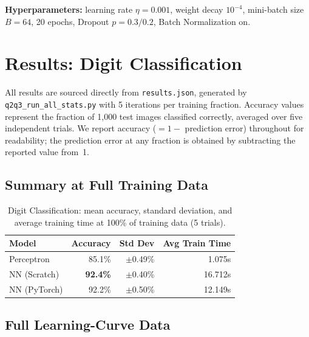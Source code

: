 \documentclass[12pt]{article}
\begin{document}
\textbf{Hyperparameters:} learning rate $\eta = 0.001$, weight decay $10^{-4}$,
mini-batch size $B = 64$, 20 epochs, Dropout $p = 0.3 / 0.2$, Batch Normalization on.

\section{Results: Digit Classification}
\label{sec:results_digits}

All results are sourced directly from \texttt{results.json}, generated by
\texttt{q2q3\_run\_all\_stats.py} with 5 iterations per training fraction.
Accuracy values represent the fraction of 1{,}000 test images classified correctly,
averaged over five independent trials. We report accuracy ($= 1 -$ prediction error)
throughout for readability; the prediction error at any fraction is obtained by
subtracting the reported value from~1.

\subsection{Summary at Full Training Data}

\begin{table}[H]
\centering
\caption{Digit Classification: mean accuracy, standard deviation, and average training
time at 100\% of training data (5 trials).}
\label{tab:digits_summary}
\begin{tabular}{lrrr}
\toprule
\textbf{Model} & \textbf{Accuracy} & \textbf{Std Dev} & \textbf{Avg Train Time} \\
\midrule
Perceptron     & 85.1\%            & $\pm$0.49\%      & 1.075s \\
NN (Scratch)   & \textbf{92.4\%}   & $\pm$0.40\%      & 16.712s \\
NN (PyTorch)   & 92.2\%            & $\pm$0.50\%      & 12.149s \\
\bottomrule
\end{tabular}
\end{table}

\subsection{Full Learning-Curve Data}
\end{document}
